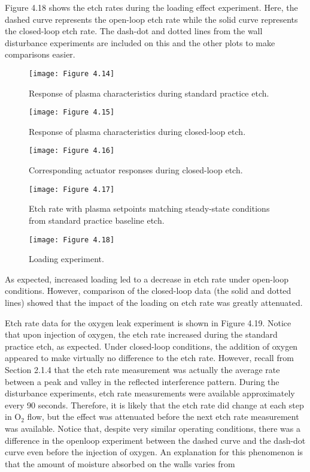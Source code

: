 Figure 4.18 shows the etch rates during the loading effect experiment. Here, the dashed
curve represents the open-loop etch rate while the solid curve represents the closed-loop etch rate. The dash-dot and dotted lines from the wall disturbance experiments are included on this and the other plots to make comparisons easier. 


\begin{figure}[H]
	\centering
	\texttt{[image: Figure 4.14]}
	\bf\caption{  Response of plasma characteristics during standard practice etch.}
	\label{fig:4.14}
\end{figure}

\begin{figure}[H]
	\centering
	\texttt{[image: Figure 4.15]}
	\bf\caption{  Response of plasma characteristics during closed-loop etch.}
	\label{fig:4.15}
\end{figure}

\begin{figure}[H]
	\centering
	\texttt{[image: Figure 4.16]}
	\bf\caption{  Corresponding actuator responses during closed-loop etch.}
	\label{fig:4.16}
\end{figure}

\begin{figure}[H]
	\centering
	\texttt{[image: Figure 4.17]}
	\bf\caption{  Etch rate with plasma setpoints matching steady-state conditions from standard practice baseline etch.}
	\label{fig:4.17}
\end{figure}

\begin{figure}[H]
	\centering
	\texttt{[image: Figure 4.18]}
	\bf\caption{  Loading experiment.}
	\label{fig:4.18}
\end{figure}

\noindent As expected, increased loading led to a decrease in etch rate under open-loop conditions. However, comparison of the closed-loop data (the solid and dotted lines) showed that the impact of the loading on etch rate was greatly attenuated.

Etch rate data for the oxygen leak experiment is shown in Figure 4.19. Notice that upon
injection of oxygen, the etch rate increased during the standard practice etch, as expected.
Under closed-loop conditions, the addition of oxygen appeared to make virtually no difference to the etch rate. However, recall from Section 2.1.4 that the etch rate measurement was
actually the average rate between a peak and valley in the reflected interference pattern.
During the disturbance experiments, etch rate measurements were available approximately
every 90 seconds. Therefore, it is likely that the etch rate did change at each step in $\text{O}_{2}$ flow, but the effect was attenuated before the next etch rate measurement was available. Notice that, despite very similar operating conditions, there was a difference in the openloop experiment between the dashed curve and the dash-dot curve even before the injection of oxygen. An explanation for this phenomenon is that the amount of moisture absorbed on the walls varies from

